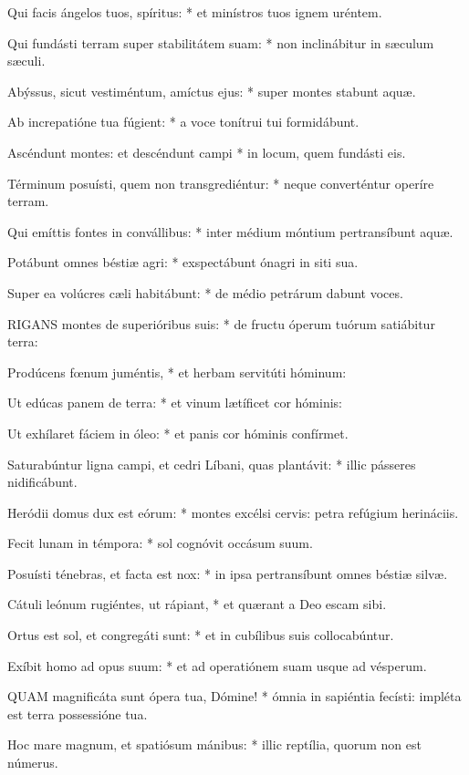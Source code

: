 Qui facis ángelos tuos, spíritus: * et minístros tuos ignem uréntem.

Qui fundásti terram super stabilitátem suam: * non inclinábitur in sæculum sæculi.

Abýssus, sicut vestiméntum, amíctus ejus: * super montes stabunt aquæ.

Ab increpatióne tua fúgient: * a voce tonítrui tui formidábunt.

Ascéndunt montes: et descéndunt campi * in locum, quem fundásti eis.

Términum posuísti, quem non transgrediéntur: * neque converténtur operíre terram.

Qui emíttis fontes in convállibus: * inter médium móntium pertransíbunt aquæ.

Potábunt omnes béstiæ agri: * exspectábunt ónagri in siti sua.

Super ea volúcres cæli habitábunt: * de médio petrárum dabunt voces.


\lettrine[lines=2]{R}{IGANS} montes de superióribus suis: * de fructu óperum tuórum satiábitur terra:

Prodúcens fœnum juméntis, * et herbam servitúti hóminum:

Ut edúcas panem de terra: * et vinum lætíficet cor hóminis:

Ut exhílaret fáciem in óleo: * et panis cor hóminis confírmet.

Saturabúntur ligna campi, et cedri Líbani, quas plantávit: * illic pásseres nidificábunt.

Heródii domus dux est eórum: * montes excélsi cervis: petra refúgium herináciis.

Fecit lunam in témpora: * sol cognóvit occásum suum.

Posuísti ténebras, et facta est nox: * in ipsa pertransíbunt omnes béstiæ silvæ.

Cátuli leónum rugiéntes, ut rápiant, * et quærant a Deo escam sibi.

Ortus est sol, et congregáti sunt: * et in cubílibus suis collocabúntur.

Exíbit homo ad opus suum: * et ad operatiónem suam usque ad vésperum.


\lettrine[lines=2]{Q}{UAM} magnificáta sunt ópera tua, Dómine! * ómnia in sapiéntia fecísti: impléta est terra possessióne tua.

Hoc mare magnum, et spatiósum mánibus: * illic reptília, quorum non est númerus.

